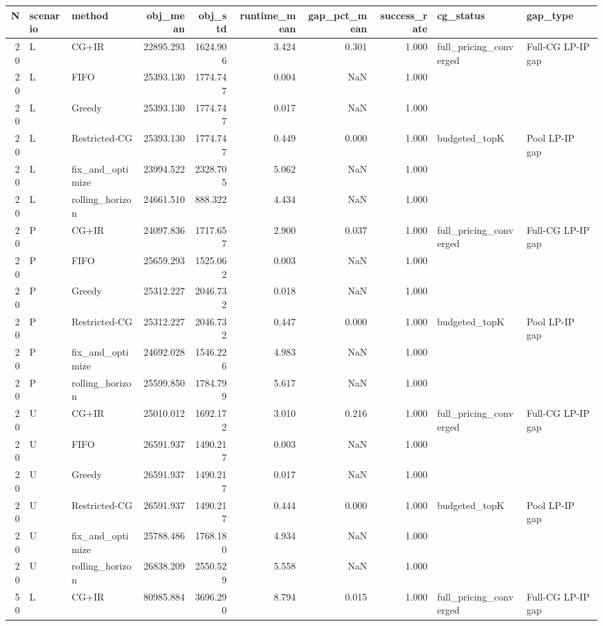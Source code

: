 \begin{tabular}{rllrrrrrll}
\toprule
N & scenario & method & obj_mean & obj_std & runtime_mean & gap_pct_mean & success_rate & cg_status & gap_type \\
\midrule
20 & L & CG+IR & 22895.293 & 1624.906 & 3.424 & 0.301 & 1.000 & full_pricing_converged & Full-CG LP-IP gap \\
20 & L & FIFO & 25393.130 & 1774.747 & 0.004 & NaN & 1.000 &  &  \\
20 & L & Greedy & 25393.130 & 1774.747 & 0.017 & NaN & 1.000 &  &  \\
20 & L & Restricted-CG & 25393.130 & 1774.747 & 0.449 & 0.000 & 1.000 & budgeted_topK & Pool LP-IP gap \\
20 & L & fix_and_optimize & 23994.522 & 2328.705 & 5.062 & NaN & 1.000 &  &  \\
20 & L & rolling_horizon & 24661.510 & 888.322 & 4.434 & NaN & 1.000 &  &  \\
20 & P & CG+IR & 24097.836 & 1717.657 & 2.900 & 0.037 & 1.000 & full_pricing_converged & Full-CG LP-IP gap \\
20 & P & FIFO & 25659.293 & 1525.062 & 0.003 & NaN & 1.000 &  &  \\
20 & P & Greedy & 25312.227 & 2046.732 & 0.018 & NaN & 1.000 &  &  \\
20 & P & Restricted-CG & 25312.227 & 2046.732 & 0.447 & 0.000 & 1.000 & budgeted_topK & Pool LP-IP gap \\
20 & P & fix_and_optimize & 24692.028 & 1546.226 & 4.983 & NaN & 1.000 &  &  \\
20 & P & rolling_horizon & 25599.850 & 1784.799 & 5.617 & NaN & 1.000 &  &  \\
20 & U & CG+IR & 25010.012 & 1692.172 & 3.010 & 0.216 & 1.000 & full_pricing_converged & Full-CG LP-IP gap \\
20 & U & FIFO & 26591.937 & 1490.217 & 0.003 & NaN & 1.000 &  &  \\
20 & U & Greedy & 26591.937 & 1490.217 & 0.017 & NaN & 1.000 &  &  \\
20 & U & Restricted-CG & 26591.937 & 1490.217 & 0.444 & 0.000 & 1.000 & budgeted_topK & Pool LP-IP gap \\
20 & U & fix_and_optimize & 25788.486 & 1768.180 & 4.934 & NaN & 1.000 &  &  \\
20 & U & rolling_horizon & 26838.209 & 2550.529 & 5.558 & NaN & 1.000 &  &  \\
50 & L & CG+IR & 80985.884 & 3696.290 & 8.794 & 0.015 & 1.000 & full_pricing_converged & Full-CG LP-IP gap \\

\end{tabular}
